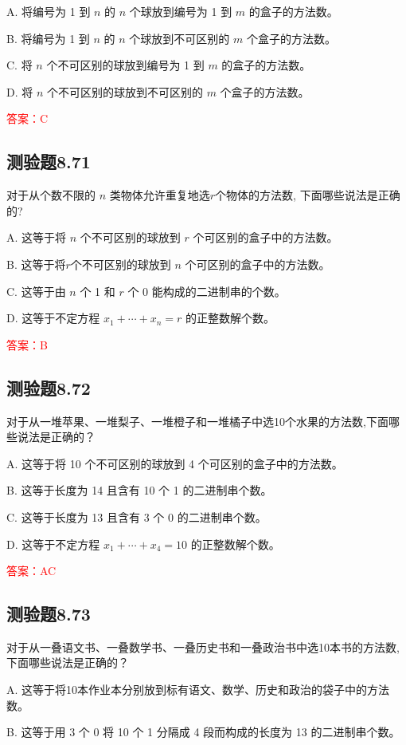 \documentclass[UTF8, heading=true]{ctexart}
\begin{document}
A. 将编号为 1 到 $n$ 的 $n$ 个球放到编号为 1 到 $m$ 的盒子的方法数。

B. 将编号为 1 到 $n$ 的 $n$ 个球放到不可区别的 $m$ 个盒子的方法数。

C. 将 $n$ 个不可区别的球放到编号为 1 到 $m$ 的盒子的方法数。

D. 将 $n$ 个不可区别的球放到不可区别的 $m$ 个盒子的方法数。

\textcolor{red}{答案：C}

\subsection{测验题8.71}

对于从个数不限的 $n$ 类物体允许重复地选$r$个物体的方法数, 下面哪些说法是正确的?

A. 这等于将 $n$ 个不可区别的球放到 $r$ 个可区别的盒子中的方法数。

B. 这等于将$r$个不可区别的球放到 $n$ 个可区别的盒子中的方法数。

C. 这等于由 $n$ 个 1 和 $r$ 个 0 能构成的二进制串的个数。

D. 这等于不定方程 $x_1+\cdots+x_n=r$ 的正整数解个数。

\textcolor{red}{答案：B}

\subsection{测验题8.72}

对于从一堆苹果、一堆梨子、一堆橙子和一堆橘子中选10个水果的方法数,下面哪些说法是正确的？

A. 这等于将 10 个不可区别的球放到 4 个可区别的盒子中的方法数。

B. 这等于长度为 14 且含有 10 个 1 的二进制串个数。

C. 这等于长度为 13 且含有 3 个 0 的二进制串个数。

D. 这等于不定方程 $x_1+\cdots+x_4=10$ 的正整数解个数。

\textcolor{red}{答案：AC}

\subsection{测验题8.73}

对于从一叠语文书、一叠数学书、一叠历史书和一叠政治书中选10本书的方法数,下面哪些说法是正确的？

A. 这等于将10本作业本分别放到标有语文、数学、历史和政治的袋子中的方法数。

B. 这等于用 3 个 0 将 10 个 1 分隔成 4 段而构成的长度为 13 的二进制串个数。
\end{document}
